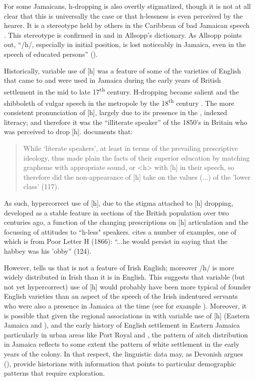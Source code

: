 For some Jamaicans, h-dropping is also overtly stigmatized, though it is not at all clear that this is universally the case or that h-lessness is even perceived by the hearer.  It is a stereotype held by others in the Caribbean of bad Jamaican speech \citep[569]{Wells1982c}.  This stereotype is confirmed in \citet[90]{Roberts1988} and in Allsopp’s dictionary.  As Allsopp points out, “/h/, especially in initial position, is lost noticeably in Jamaica, even in the speech of educated persons” (\citeyear[xlvii]{Allsopp1996}).

Historically, variable use of [h] was a feature of some of the varieties of English that came to and were used in Jamaica during the early years of British settlement in the mid to late 17\textsuperscript{th} century.  H-dropping became salient and the shibboleth of vulgar speech in the metropole by the 18\textsuperscript{th} century \citep[103]{Beal2002}.  The more consistent pronunciation of [h], largely due to its presence in the , indexed literacy; and therefore it was the ``illiterate speaker'' of the 1850's in Britain who was perceived to drop [h].  \citet{Mugglestone1995} documents that:  

\begin{quote}
	While `literate speakers', at least in terms of the prevailing prescriptive ideology, thus made plain the facts of their superior education by matching grapheme with appropriate sound, or <h> with [h] in their speech, so therefore did the non-appearance of [h] take on the values (${\ldots}$) of the 'lower class' (117).  
\end{quote}

As such, hypercorrect use of [h], due to the stigma attached to [h] dropping, developed as a stable feature in sections of the British population over two centuries ago, a function of the changing prescriptions on [h] articulation and the focussing of attitudes to ``h-less" speakers.  \citet{Mugglestone1995} cites a number of examples, one of which is from Poor Letter H (1866): ``...he would persist in saying that the habbey was his 'obby'' (124).

However, \citet[432]{Wells1982b} tells us that  is not a feature of Irish English; moreover /h/ is more widely distributed in Irish than it is in English.  This suggests that variable (but not yet hypercorrect) use of [h] would probably have been more typical of founder English varieties \citep[lxii]{Cassidy1967} than an aspect of the speech of the Irish indentured servants who were also a presence in Jamaica at the time (see for example \citealt[228]{Beckles2000}).  Moreover, it is possible that given the regional associations in  with variable use of [h] (Eastern Jamaica and ), and the early history of English settlement in Eastern Jamaica \citep[85]{Sherlock1998} particularly in urban areas like Port Royal and , the pattern of aitch distribution in Jamaica reflects to some extent the pattern of white settlement in the early years of the colony.  In that respect, the linguistic data may, as Devonish argues (\citeyear[180]{Devonish2002}), provide historians with information that points to particular demographic patterns that require exploration.         


